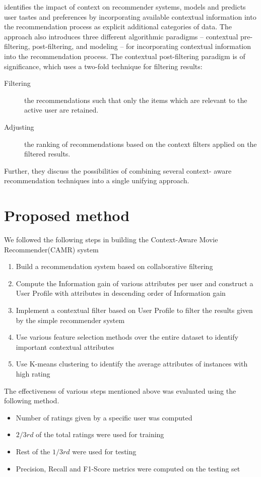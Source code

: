 \documentclass{article}
\begin{document}
\cite{adomavicius2011context} identifies the impact of context on recommender systems, models and predicts user tastes and preferences by incorporating available contextual information into the recommendation process as explicit additional categories of data. The approach also introduces three different algorithmic paradigms – contextual pre-
filtering, post-filtering, and modeling – for incorporating contextual information into the recommendation process. The contextual post-filtering paradigm is of significance, which uses a two-fold technique for filtering results:
\begin{description}
\item[Filtering] the recommendations such that only the items which are relevant to the active user are retained.
\item[Adjusting] the ranking of recommendations based on the context filters applied on the filtered results.
\end{description}
Further, they discuss the possibilities of combining several context- aware recommendation techniques into a single unifying approach.

\section{Proposed method}


We followed the following steps in building the Context-Aware Movie Recommender(CAMR) system

\begin{enumerate}
\item Build a recommendation system based on collaborative filtering
\item Compute the Information gain of various attributes per user and construct a User Profile with attributes in descending order of Information gain 
\item Implement a contextual filter based on User Profile to filter the results given by the simple recommender system
\item Use various feature selection methods over the entire dataset to identify important contextual attributes
\item Use K-means clustering to identify the average attributes of instances with high rating
\end{enumerate}


The effectiveness of various steps mentioned above was evaluated using the following method.

\begin{itemize}
\item Number of ratings given by a specific user was computed 
\item $2/3rd$ of the total ratings were used for training
\item Rest of the $1/3rd$ were used for testing
\item Precision, Recall and F1-Score metrics were computed on the testing set 
\end{itemize}
\end{document}
